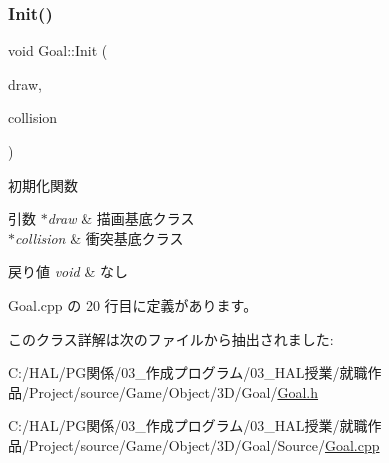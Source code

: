 \subsubsection{\texorpdfstring{Init()}{Init()}}
{\footnotesize\ttfamily void Goal\+::\+Init (\begin{DoxyParamCaption}\item[{\mbox{\hyperlink{class_draw_base}{Draw\+Base}} $\ast$}]{draw,  }\item[{\mbox{\hyperlink{class_collision_base}{Collision\+Base}} $\ast$}]{collision }\end{DoxyParamCaption})}



初期化関数 


\begin{DoxyParams}{引数}
{\em $\ast$draw} & 描画基底クラス \\
\hline
{\em $\ast$collision} & 衝突基底クラス \\
\hline
\end{DoxyParams}

\begin{DoxyRetVals}{戻り値}
{\em void} & なし \\
\hline
\end{DoxyRetVals}


 Goal.\+cpp の 20 行目に定義があります。



このクラス詳解は次のファイルから抽出されました\+:\begin{DoxyCompactItemize}
\item 
C\+:/\+H\+A\+L/\+P\+G関係/03\+\_\+作成プログラム/03\+\_\+\+H\+A\+L授業/就職作品/\+Project/source/\+Game/\+Object/3\+D/\+Goal/\mbox{\hyperlink{_goal_8h}{Goal.\+h}}\item 
C\+:/\+H\+A\+L/\+P\+G関係/03\+\_\+作成プログラム/03\+\_\+\+H\+A\+L授業/就職作品/\+Project/source/\+Game/\+Object/3\+D/\+Goal/\+Source/\mbox{\hyperlink{_goal_8cpp}{Goal.\+cpp}}\end{DoxyCompactItemize}
